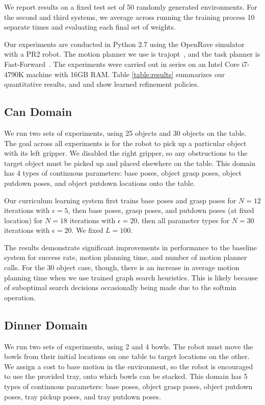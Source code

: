 We report results on a fixed test set of 50 randomly generated environments.
For the second and third systems, we average across running the training process 10 separate times
and evaluating each final set of weights.

Our experiments are conducted in Python 2.7 using the OpenRave simulator~\cite{Diankov_2008_6117} with a PR2 robot.
The motion planner we use is trajopt~\cite{schulman2013finding}, and the task planner is Fast-Forward~\cite{FF}.
The experiments were carried out in series on an Intel Core i7-4790K machine with 16GB RAM.
Table \ref{table:results} summarizes our quantitative results, and  and 
show learned refinement policies.

\subsection{Can Domain}
We run two sets of experiments, using 25 objects and 30 objects on the table.
The goal across all experiments is for the robot to pick up a particular object with its
left gripper. We disabled the right gripper, so any obstructions to the target object must be picked up and
placed elsewhere on the table. This domain has 4 types of continuous parameters: base poses, object grasp
poses, object putdown poses, and object putdown locations onto the table.

Our curriculum learning system first trains base poses and grasp poses for $N = 12$ iterations with $\epsilon = 5$,
then base poses, grasp poses, and putdown poses (at fixed location) for $N = 18$ iterations with $\epsilon = 20$,
then all parameter types for $N = 30$ iterations with $\epsilon = 20$. We fixed $L = 100$.

The results demonstrate significant improvements in performance to the baseline system for success rate, motion planning
time, and number of motion planner calls. For the 30 object case, though,
there is an increase in average motion planning time when we use trained graph search heuristics. This is likely because of suboptimal
search decisions occasionally being made due to the softmin operation.

\subsection{Dinner Domain}
We run two sets of experiments, using 2 and 4 bowls. The robot must move the
bowls from their initial locations on one table to target locations on the other. We assign a cost to
base motion in the environment, so the robot is encouraged to use the provided tray, onto which bowls can be stacked.
This domain has 5 types of continuous parameters: base poses, object grasp poses, object putdown poses, tray pickup
poses, and tray putdown poses.

